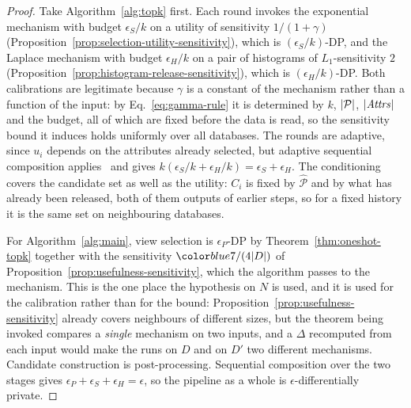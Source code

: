 \begin{proof}
Take Algorithm~\ref{alg:topk} first.
Each round invokes the exponential mechanism with budget $\epsilon_S/k$ on a utility of sensitivity $1/(1+\gamma)$ (Proposition~\ref{prop:selection-utility-sensitivity}), which is $(\epsilon_S/k)$-DP, and the Laplace mechanism with budget $\epsilon_H/k$ on a pair of histograms of $L_1$-sensitivity $2$ (Proposition~\ref{prop:histogram-release-sensitivity}), which is $(\epsilon_H/k)$-DP.
Both calibrations are legitimate because $\gamma$ is a constant of the mechanism rather than a function of the input: by Eq.~\eqref{eq:gamma-rule} it is determined by $k$, $|\mathcal{P}|$, $|\mathit{Attrs}|$ and the budget, all of which are fixed before the data is read, so the sensitivity bound it induces holds uniformly over all databases.
The rounds are adaptive, since $u_i$ depends on the attributes already selected, but adaptive sequential composition applies~\cite{DBLP:series/synthesis/2016Li} and gives $k(\epsilon_S/k+\epsilon_H/k)=\epsilon_S+\epsilon_H$.
The conditioning covers the candidate set as well as the utility: $C_i$ is fixed by $\widehat{\mathcal{P}}$ and by what has already been released, both of them outputs of earlier steps, so for a fixed history it is the same set on neighbouring databases.

For Algorithm~\ref{alg:main}, view selection is $\epsilon_P$-DP by Theorem~\ref{thm:oneshot-topk} together with the sensitivity $\added{7/(4|D|)}$ of Proposition~\ref{prop:usefulness-sensitivity}, which the algorithm passes to the mechanism.
This is the one place the hypothesis on $N$ is used, and it is used for the calibration rather than for the bound: Proposition~\ref{prop:usefulness-sensitivity} already covers neighbours of different sizes, but the theorem being invoked compares a \emph{single} mechanism on two inputs, and a $\Delta$ recomputed from each input would make the runs on $D$ and on $D'$ two different mechanisms.
Candidate construction is post-processing.
Sequential composition over the two stages gives $\epsilon_P+\epsilon_S+\epsilon_H=\epsilon$, so the pipeline as a whole is $\epsilon$-differentially private.
\end{proof}


